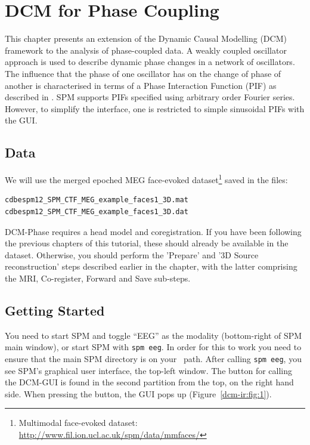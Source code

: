 \chapter{DCM for Phase Coupling \label{Chap:data:dcm_phase}}

This chapter presents an extension of the Dynamic Causal Modelling (DCM) framework to the analysis of phase-coupled data. A weakly coupled oscillator approach is used to describe dynamic phase changes in a network of oscillators.
The influence that the phase of one oscillator has on the change of phase of another is characterised in terms of a Phase Interaction Function (PIF) as described in \cite{dcm_phase}. SPM supports PIFs specified using arbitrary order Fourier series. However, to simplify the interface, one is restricted to simple sinusoidal PIFs with the GUI. 

\section{Data}

We will use the merged epoched MEG face-evoked dataset\footnote{Multimodal face-evoked dataset: \url{http://www.fil.ion.ucl.ac.uk/spm/data/mmfaces/}} saved in the files:

\begin{verbatim}
cdbespm12_SPM_CTF_MEG_example_faces1_3D.mat
cdbespm12_SPM_CTF_MEG_example_faces1_3D.dat
\end{verbatim}

DCM-Phase requires a head model and coregistration. If you have been following the previous chapters of this tutorial, these should already be available in the dataset. Otherwise, you should perform the 'Prepare' and '3D Source reconstruction' steps described earlier in the chapter, with the latter 
comprising the MRI, Co-register, Forward and Save sub-steps.

\section{Getting Started}

You need to start SPM and toggle ``EEG'' as the modality (bottom-right of SPM main window), or start SPM with \texttt{spm eeg}. In order for this to work you need to ensure that the main SPM directory is on your \matlab\ path.
After calling \texttt{spm eeg}, you see SPM's graphical user interface, the top-left window. The button for calling the DCM-GUI is found in the second partition from the top, on the right hand side. When pressing the button, the GUI pops up (Figure~\ref{dcm-ir:fig:1}).

